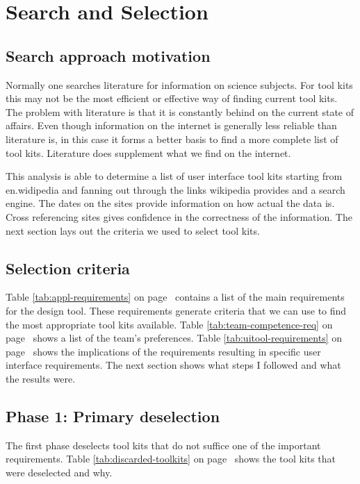 \section{Search and Selection}

\subsection{Search approach motivation}

Normally one searches literature for information on science subjects.  For tool
kits this may not be the most efficient or effective way of finding current
tool kits. The problem with literature is that it is constantly behind on the
current state of affairs. Even though information on the internet is generally
less reliable than literature is, in this case it forms a better basis to find
a more complete list of tool kits. Literature does supplement what we find on
the internet.

This analysis is able to determine a list of user interface tool kits starting
from en.widipedia and fanning out through the links wikipedia provides and a
search engine. The dates on the sites provide information on how actual the
data is. Cross referencing sites gives confidence in the correctness of the
information. The next section lays out the criteria we used to select tool
kits.

\subsection{Selection criteria}

Table \ref{tab:appl-requirements} on page~\pageref{tab:appl-requirements}
contains a list of the main requirements for the design tool. These
requirements generate criteria that we can use to find the most appropriate
tool kits available.  Table \ref{tab:team-competence-req} on
page~\pageref{tab:team-competence-req} shows a list of the team's preferences.
Table \ref{tab:uitool-requirements} on page~\pageref{tab:uitool-requirements}
shows the implications of the requirements resulting in specific user interface
requirements. The next section shows what steps I followed and what the
results were.

\subsection{Phase 1: Primary deselection}

The first phase deselects tool kits that do not suffice one
of the important requirements.  Table \ref{tab:discarded-toolkits} on
page~\pageref{tab:discarded-toolkits} shows the tool kits that were deselected
and why.

